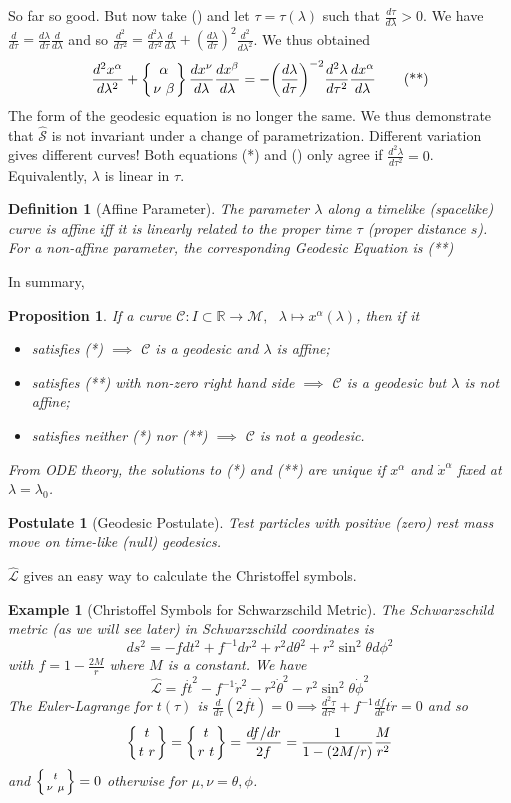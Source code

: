 \documentclass[a4paper]{article}
\newtheorem{post}{Postulate}[section]
\newtheorem{eg}{Example}[section]
\theoremstyle{new}
\newtheorem{defi}{Definition}[section]
\newtheorem{prop}{Proposition}[section]
\begin{document}
So far so good. But now take (\dag) and let $\tau=\tau(\lambda)$ such that $\frac{d\tau}{d\lambda}>0$. We have $\frac{d}{d\tau}=\frac{d\lambda}{d\tau}\frac{d}{d\lambda}$ and so $\frac{d^2}{d\tau^2}=\frac{d^2\lambda}{d\tau^2}\frac{d}{d\lambda}+(\frac{d\lambda}{d\tau})^2\frac{d^2}{d\lambda^2}$. We thus obtained
\begin{equation}
\frac{d^2x^\alpha}{d\lambda^2}+\left \{ {\alpha \atop
\nu\ \beta}\right\}\frac{dx^\nu}{d\lambda}\frac{dx^\beta}{d\lambda}=-\bigg(\frac{d\lambda}{d\tau}\bigg)^{-2}\frac{d^2\lambda}{d\tau^2}\frac{dx^\alpha}{d\lambda}\tag{**}
\end{equation}
The form of the geodesic equation is no longer the same. We thus demonstrate that $\hat{\mathcal{S}}$ is not invariant under a change of parametrization. Different variation gives different curves! Both equations (*) and (\dag) only agree if $\frac{d^2\lambda}{d\tau^2}=0$. Equivalently, $\lambda$ is linear in $\tau$. 
\begin{defi}[Affine Parameter]
The parameter $\lambda$ along a timelike (spacelike) curve is affine iff it is linearly related to the proper time $\tau$ (proper distance $s$). For a non-affine parameter, the corresponding Geodesic Equation is (**)
\end{defi}
In summary,
\begin{prop}
If a curve $\mathcal{C}:I\subset\mathbb{R}\rightarrow\mathcal{M},\text{  }\lambda\mapsto x^\alpha(\lambda)$, then if it
\begin{itemize}
    \item satisfies (*) $\implies$ $\mathcal{C}$ is a geodesic and $\lambda$ is affine;
    \item satisfies (**) with non-zero right hand side $\implies$ $\mathcal{C}$ is a geodesic but $\lambda$ is not affine;
    \item satisfies neither (*) nor (**) $\implies$ $\mathcal{C}$ is not a geodesic.
\end{itemize}
From ODE theory, the solutions to (*) and (**) are unique if $x^\alpha$ and $\dot{x}^\alpha$ fixed at $\lambda=\lambda_0$.
\end{prop}
\begin{post}[Geodesic Postulate]
Test particles with positive (zero) rest mass move on time-like (null) geodesics.
\end{post}
$\hat{\mathcal{L}}$ gives an easy way to calculate the Christoffel symbols.
\begin{eg}[Christoffel Symbols for Schwarzschild Metric]
The Schwarzschild metric (as we will see later) in Schwarzschild coordinates is
$$ds^2=-fdt^2+f^{-1}dr^2+r^2d\theta^2+r^2\sin^2\theta d\phi^2$$
with $f=1-\frac{2M}{r}$ where $M$ is a constant. We have
$$\hat{\mathcal{L}}=f\dot{t}^2-f^{-1}\dot{r}^2-r^2\dot{\theta}^2-r^2\sin^2\theta\dot{\phi}^2$$
The Euler-Lagrange for $t(\tau)$ is $\frac{d}{d\tau}(2f\dot{t})=0\implies\frac{d^2\tau}{d\tau^2}+f^{-1}\frac{df}{dr}\dot{t}\dot{r}=0$ and so 
$$\left \{ {t \atop t\ r}\right\}=\left \{ {t \atop r\ t}\right\}=\frac{df/dr}{2f}=\frac{1}{1-(2M/r)}\frac{M}{r^2}$$
and $\left \{ {t \atop \nu\ \mu}\right\}=0$ otherwise for $\mu,\nu=\theta,\phi$.
\end{eg}
\newpage
\end{document}
